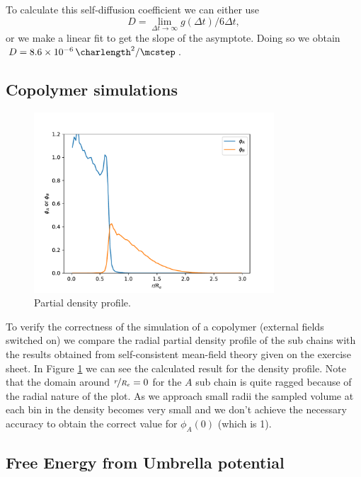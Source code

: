 \documentclass[../main.tex]{subfiles}
\begin{document}
To calculate this self-diffusion coefficient we can either use 
\[
    D = \lim\limits_{\Delta t \to \infty} g(\Delta t)/6\Delta t
,\] 
or we make a linear fit to get the slope of the asymptote.
Doing so we obtain $D = \SI{8.6e-6}{\charlength\squared\per\mcstep}$.


\subsection{Copolymer simulations}

\begin{figure}[htpb]
    \centering
    \includegraphics[width=0.8\textwidth]{../figures/ex1_partial_density_profile.pdf}
    \caption{
        Partial density profile.
    }
    \label{fig:ex1_partial_density_profile}
\end{figure}

To verify the correctness of the simulation of a copolymer (external fields switched on) we compare the radial partial density profile of the sub chains with the results obtained from self-consistent mean-field theory given on the exercise sheet.
In Figure \ref{fig:ex1_partial_density_profile} we can see the calculated result for the density profile.
Note that the domain around $\nicefrac{r}{R_e} = 0$ for the $A$ sub chain is quite ragged because of the radial nature of the plot.
As we approach small radii the sampled volume at each bin in the density becomes very small and we don't achieve the necessary accuracy to obtain the correct value for $\phi_A(0)$ (which is 1).
\par

\subsection{Free Energy from Umbrella potential}
\end{document}
